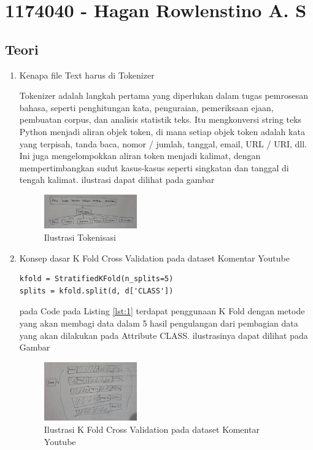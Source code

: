 \section{1174040 - Hagan Rowlenstino A. S}
\subsection{Teori}
\begin{enumerate}
\item Kenapa file Text harus di Tokenizer
\par Tokenizer adalah langkah pertama yang diperlukan dalam tugas pemrosesan bahasa, seperti penghitungan kata, penguraian, pemeriksaan ejaan, pembuatan corpus, dan analisis statistik teks. Itu mengkonversi string teks Python menjadi aliran objek token, di mana setiap objek token adalah kata yang terpisah, tanda baca, nomor / jumlah, tanggal, email, URL / URI, dll. Ini juga mengelompokkan aliran token menjadi kalimat, dengan mempertimbangkan sudut kasus-kasus seperti singkatan dan tanggal di tengah kalimat. ilustrasi dapat dilihat pada gambar

\begin{figure}[H]
    \includegraphics[width=4cm]{figures/1174040/chapter7/teori1.jpeg}
    \centering
      \caption{Ilustrasi Tokenisasi}
\end{figure}

\item Konsep dasar K Fold Cross Validation pada dataset Komentar Youtube

\begin{lstlisting}[caption=K Fold Cross Validation,label={lst:1}]
kfold = StratifiedKFold(n_splits=5)
splits = kfold.split(d, d['CLASS'])
\end{lstlisting}

\par pada Code pada Listing \ref{lst:1} terdapat penggunaan K Fold dengan metode yang akan membagi data dalam 5 hasil pengulangan dari pembagian data yang akan dilakukan pada Attribute CLASS. ilustrasinya dapat dilihat pada Gambar

\begin{figure}[H]
    \includegraphics[width=4cm]{figures/1174040/chapter7/teori2.jpeg}
    \centering
      \caption{Ilustrasi  K Fold Cross Validation pada dataset Komentar Youtube}
\end{figure}


\end{enumerate}
